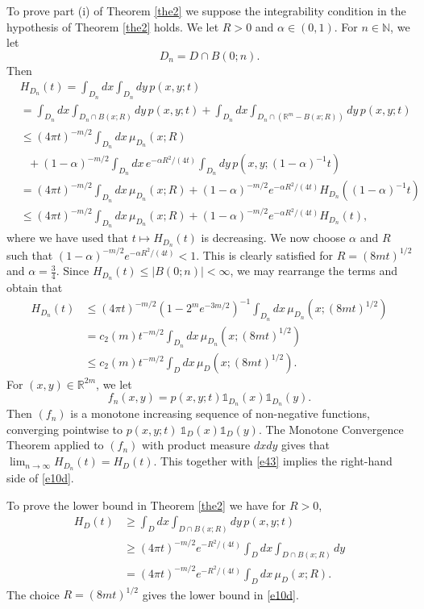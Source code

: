 \documentclass[a4paper,9pt]{amsart}
\begin{document}
To prove part (i) of Theorem \ref{the2} we suppose the
integrability condition in the hypothesis of Theorem \ref{the2}
holds. We let $R>0$ and $\alpha\in(0,1)$. For $n
\in {\mathbb{N}}$, we let
\begin{equation*}
D_n=D\cap B(0;n).
\end{equation*}
Then
\begin{align*}
&H_{D_n}(t)=\int_{D_n}dx \int_{D_n} dy \, p(x,y;t)\nonumber
\\& = \int_{D_n}dx\int_{D_n\cap B(x;R)}dy \,
p(x,y;t)+\int_{D_n}dx\int_{D_n\cap ({\mathbb{R}}^{m} - B(x;R))}dy \,
p(x,y;t)\nonumber \\ & \le (4\pi t)^{-m/2}\int_{D_n}dx \,
\mu_{D_n}(x;R)\nonumber
\\ &\ \ \  +(1-\alpha)^{-m/2}\int_{D_n}dx \, e^{-\alpha
R^2/(4t)}\int_{D_n}dy \, p(x,y;(1-\alpha)^{-1}t)\nonumber \\ & =(4\pi
t)^{-m/2}\int_{D_n}dx \, \mu_{D_n}(x;R)+(1-\alpha)^{-m/2}e^{-\alpha
R^2/(4t)}H_{D_n}((1-\alpha)^{-1}t)\nonumber \\ & \le(4\pi
t)^{-m/2}\int_{D_n}dx \, \mu_{D_n}(x;R)+(1-\alpha)^{-m/2}e^{-\alpha
R^2/(4t)}H_{D_n}(t),
\end{align*}
where we have used that $t\mapsto H_{D_n}(t)$ is decreasing. We
now choose $\alpha$ and $R$ such that $(1-\alpha)^{-m/2}e^{-\alpha
R^2/(4t)}<1$. This is clearly satisfied for $R=(8mt)^{1/2}$ and
$\alpha=\frac{3}{4}$. Since $H_{D_n}(t)\le|B(0;n)|<\infty$, we may
rearrange the terms and obtain that
\begin{align}\label{e43}
H_{D_n}(t)&\le(4\pi t)^{-m/2}\left(1-2^me^{-3m/2}
\right)^{-1}\int_{D_n}dx \, \mu_{D_n}(x;(8mt)^{1/2})\nonumber \\ &
=c_2(m)t^{-m/2}\int_{D_n}dx \, \mu_{D_n}(x;(8mt)^{1/2})\nonumber
\\ & \le c_2(m)t^{-m/2}\int_{D}dx \, \mu_{D}(x;(8mt)^{1/2}).
\end{align}
For $(x,y)\in {\mathbb{R}}^{2m}$, we let
\begin{equation*}
f_n(x,y)=p(x,y;t)\mathds{1}_{D_n}(x)\mathds{1}_{D_n}(y).
\end{equation*}
Then $(f_n)$ is a monotone increasing sequence of non-negative
functions, converging pointwise to
$p(x,y;t)~\mathds{1}_{D}(x)\mathds{1}_{D}(y)$. The Monotone
Convergence Theorem applied to $(f_n)$ with product measure $dxdy$
gives that $\lim_{n\rightarrow \infty} H_{D_n}(t)=H_D(t)$. This
together with \eqref{e43} implies the right-hand side of
\eqref{e10d}.

To prove the lower bound in Theorem \ref{the2} we have for $R>0$,
\begin{align*}
H_D(t)&\ge \int_Ddx\int_{D\cap B(x;R)}dy \, p(x,y;t)\\ &
\ge (4\pi t)^{-m/2}e^{-R^2/(4t)}\int_Ddx\int_{D\cap
B(x;R)}dy\\& =(4\pi
t)^{-m/2}e^{-R^2/(4t)}\int_Ddx \, \mu_D(x;R).
\end{align*}
The choice $R=(8mt)^{1/2}$ gives the lower bound in \eqref{e10d}.
\end{document}
